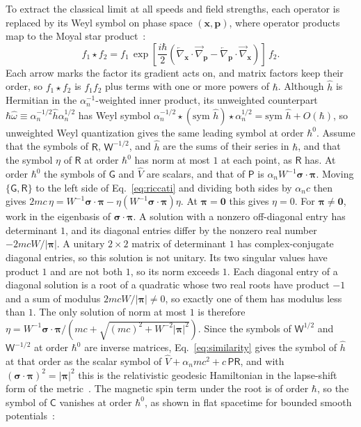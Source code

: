 \documentclass[aps,prd,onecolumn,tightenlines,nofootinbib,notitlepage,11pt,floatfix]{revtex4-2}
\theoremstyle{indentedtheorem}
\begin{document}
To extract the classical limit at all speeds and field strengths, each operator is replaced by its Weyl symbol on phase space $(\mathbf{x},\mathbf{p})$, where operator products map to the Moyal star product~\citep{CurtrightZachos2012Quantum}:
\begin{equation}
    f_1\star f_2 = f_1\,\exp\!\left[\frac{i\hbar}{2}\left(\overleftarrow{\nabla}_{\mathbf{x}}\cdot\overrightarrow{\nabla}_{\mathbf{p}}-\overleftarrow{\nabla}_{\mathbf{p}}\cdot\overrightarrow{\nabla}_{\mathbf{x}}\right)\right]\,f_2 .
    \label{eq:moyal}
\end{equation}
Each arrow marks the factor its gradient acts on, and matrix factors keep their order, so $f_1\star f_2$ is $f_1f_2$ plus terms with one or more powers of $\hbar$. Although $\hat{h}$ is Hermitian in the $\alpha_n^{-1}$-weighted inner product, its unweighted counterpart $\hbar\hat{\omega} \equiv \alpha_n^{-1/2}\hat{h}\alpha_n^{1/2}$ has Weyl symbol $\alpha_n^{-1/2}\star(\text{sym }\hat{h})\star\alpha_n^{1/2} = \text{sym }\hat{h} + O(\hbar)$, so unweighted Weyl quantization gives the same leading symbol at order $\hbar^0$. Assume that the symbols of $\mathsf{R}$, $\mathsf{W}^{-1/2}$, and $\hat{h}$ are the sums of their series in $\hbar$, and that the symbol $\eta$ of $\mathsf{R}$ at order $\hbar^0$ has norm at most $1$ at each point, as $\mathsf{R}$ has. At order $\hbar^0$ the symbols of $\mathsf{G}$ and $\hat{V}$ are scalars, and that of $\mathsf{P}$ is $\alpha_nW^{-1}\boldsymbol{\sigma}\cdot\boldsymbol{\pi}$. Moving $\{\mathsf{G},\mathsf{R}\}$ to the left side of Eq.~\eqref{eq:riccati} and dividing both sides by $\alpha_nc$ then gives $2mc\,\eta = W^{-1}\boldsymbol{\sigma}\cdot\boldsymbol{\pi} - \eta(W^{-1}\boldsymbol{\sigma}\cdot\boldsymbol{\pi})\eta$. At $\boldsymbol{\pi}=\mathbf{0}$ this gives $\eta=0$. For $\boldsymbol{\pi}\neq\mathbf{0}$, work in the eigenbasis of $\boldsymbol{\sigma}\cdot\boldsymbol{\pi}$. A solution with a nonzero off-diagonal entry has determinant $1$, and its diagonal entries differ by the nonzero real number $-2mcW/|\boldsymbol{\pi}|$. A unitary $2\times2$ matrix of determinant $1$ has complex-conjugate diagonal entries, so this solution is not unitary. Its two singular values have product $1$ and are not both $1$, so its norm exceeds $1$. Each diagonal entry of a diagonal solution is a root of a quadratic whose two real roots have product $-1$ and a sum of modulus $2mcW/|\boldsymbol{\pi}|\neq0$, so exactly one of them has modulus less than $1$. The only solution of norm at most $1$ is therefore $\eta = W^{-1}\boldsymbol{\sigma}\cdot\boldsymbol{\pi}/(mc + \sqrt{(mc)^2+W^{-2}|\boldsymbol{\pi}|^2})$. Since the symbols of $\mathsf{W}^{1/2}$ and $\mathsf{W}^{-1/2}$ at order $\hbar^0$ are inverse matrices, Eq.~\eqref{eq:similarity} gives the symbol of $\hat{h}$ at that order as the scalar symbol of $\hat{V}+\alpha_nmc^2+c\,\mathsf{P}\mathsf{R}$, and with $(\boldsymbol{\sigma}\cdot\boldsymbol{\pi})^2=|\boldsymbol{\pi}|^2$ this is the relativistic geodesic Hamiltonian in the lapse-shift form of the metric~\citep{MTW1973Gravitation}. The magnetic spin term under the root is of order $\hbar$, so the symbol of $\mathsf{C}$ vanishes at order $\hbar^0$, as shown in flat spacetime for bounded smooth potentials~\citep{PanatiSpohnTeufel2003Space}:
\end{document}
